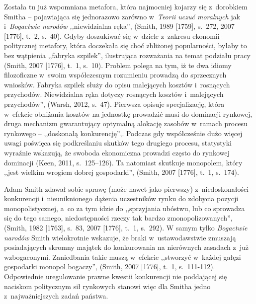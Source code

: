 Została tu już wspomniana metafora, która najmocniej kojarzy się z~dorobkiem Smitha -- pojawiająca się jednorazowo zarówno w~\textit{Teorii uczuć moralnych} jak i~\textit{Bogactwie narodów ,,}niewidzialna ręka'', \label{ref:RND3arQWlZpRs}(Smith, 1989 [1759], s.~272, 2007 [1776], t.~2, s.~40). Gdyby doszukiwać się w~dziele z~zakresu ekonomii politycznej metafory, która doczekała się choć zbliżonej popularności, byłaby to bez wątpienia ,,fabryka szpilek'', ilustrująca rozważania na temat podziału pracy \label{ref:RNDhErhk4QekH}(Smith, 2007 [1776], t.~1, s.~10). Problem polega na tym, iż te dwa idiomy filozoficzne w~swoim współczesnym rozumieniu prowadzą do sprzecznych wniosków. Fabryka szpilek służy do opisu malejących kosztów i~rosnących przychodów. Niewidzialna ręka dotyczy rosnących kosztów i~malejących przychodów'', \label{ref:RNDXgp9RVVtIw}(Warsh, 2012, s.~47). Pierwsza opisuje specjalizację, która w~efekcie obniżania kosztów na jednostkę prowadzić musi do dominacji rynkowej, druga mechanizm gwarantujący optymalną alokację zasobów w~ramach procesu rynkowego -- ,,doskonałą konkurencję'',. Podczas gdy współcześnie dużo więcej uwagi poświęca się podkreślaniu skutków tego drugiego procesu, statystyki wyraźnie wskazują, że swoboda ekonomiczna prowadzi często do rynkowej dominacji \label{ref:RNDf5LDvzVDLR}(Keen, 2011, s.~125–126). Ta natomiast skutkuje monopolem, który ,,jest wielkim wrogiem dobrej gospodarki'', \label{ref:RNDQi3f6tgrVU}(Smith, 2007 [1776], t.~1, s.~174).

Adam Smith zdawał sobie sprawę (może nawet jako pierwszy) z~niedoskonałości konkurencji i~nieuniknionego dążenia uczestników rynku do zdobycia pozycji monopolistycznej, a~co za tym idzie do ,,sprzyjania ubóstwu, lub co sprowadza się do tego samego, niedostępności rzeczy tak bardzo zmonopolizowanych'', \label{ref:RNDSBDgty6ieq}(Smith, 1982 [1763], s.~83, 2007 [1776], t.~1, s.~292). W samym tylko \textit{Bogactwie narodów} Smith wielokrotnie wskazuje, że braki w~ustawodawstwie zmuszają posiadających skromny majątek do konkurowania na nierównych zasadach z~już wzbogaconymi. Zaniedbania takie muszą w~efekcie ,,stworzyć w~każdej gałęzi gospodarki monopol bogaczy'', \label{ref:RNDnMNpl04czP}(Smith, 2007 [1776], t.~1, s.~111-112). Odpowiednie uregulowanie prawne kwestii konkurencji nie poddającej się naciskom politycznym sił rynkowych stanowi więc dla Smitha jedno z~najważniejszych zadań państwa.

